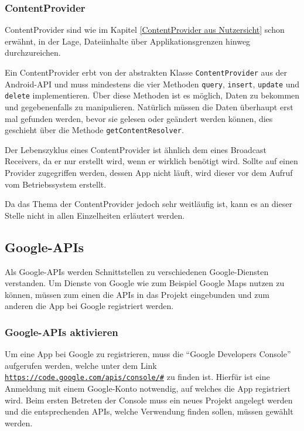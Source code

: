 \subsubsection{ContentProvider}
ContentProvider sind wie im Kapitel \ref{ContentProvider aus Nutzersicht} schon erw\"ahnt, in der Lage, Dateiinhalte \"uber Applikationsgrenzen hinweg durchzureichen.

Ein ContentProvider erbt von der abstrakten Klasse \texttt{ContentProvider} aus der Android-API und muss mindestens die vier Methoden \texttt{query}, \texttt{insert}, \texttt{update} und \texttt{delete} implementieren. \"Uber diese Methoden ist es m\"oglich, Daten zu bekommen und gegebenenfalls zu manipulieren. Nat\"urlich m\"ussen die Daten \"uberhaupt erst mal gefunden werden, bevor sie gelesen oder ge\"andert werden k\"onnen, dies geschieht \"uber die Methode \texttt{getContentResolver}. \cite{Kuehn12}

Der Lebenszyklus eines ContentProvider ist \"ahnlich dem eines Broadcast Receivers, da er nur erstellt wird, wenn er wirklich ben\"otigt wird. Sollte auf einen Provider zugegriffen werden, dessen App nicht l\"auft, wird dieser vor dem Aufruf vom Betriebssystem erstellt.

Da das Thema der ContentProvider jedoch sehr weitl\"aufig ist, kann es an dieser Stelle nicht in allen Einzelheiten erl\"autert werden. \cite{DevContentProviders}

\subsection{Google-APIs} \label{Google-APIs}
Als Google-APIs werden Schnittstellen zu verschiedenen Google-Diensten verstanden. Um Dienste von Google wie zum Beispiel Google Maps nutzen zu k\"onnen, m\"ussen zum einen die APIs in das Projekt eingebunden und zum anderen die App bei Google registriert werden.


\subsubsection{Google-APIs aktivieren}
Um eine App bei Google zu registrieren, muss die "`Google Developers Console"' aufgerufen werden, welche unter dem Link \texttt{\url{https://code.google.com/apis/console/\#}} zu finden ist. Hierf\"ur ist eine Anmeldung mit einem Google-Konto notwendig, auf welches die App registriert wird. Beim ersten Betreten der Console muss ein neues Projekt angelegt werden und die entsprechenden APIs, welche Verwendung finden sollen, m\"ussen gew\"ahlt werden.

